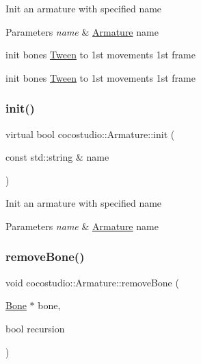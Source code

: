 Init an armature with specified name 
\begin{DoxyParams}{Parameters}
{\em name} & \hyperlink{classcocostudio_1_1Armature}{Armature} name \\
\hline
\end{DoxyParams}
init bone\textquotesingle{}s \hyperlink{classcocostudio_1_1Tween}{Tween} to 1st movement\textquotesingle{}s 1st frame

init bone\textquotesingle{}s \hyperlink{classcocostudio_1_1Tween}{Tween} to 1st movement\textquotesingle{}s 1st frame \mbox{\label{classcocostudio_1_1Armature_a22bc686ea92c2dad9559d848fb3554f1}} 
\subsubsection{\texorpdfstring{init()}{init()}\hspace{0.1cm}{\footnotesize\ttfamily [4/4]}}
{\footnotesize\ttfamily virtual bool cocostudio\+::\+Armature\+::init (\begin{DoxyParamCaption}\item[{const std\+::string \&}]{name }\end{DoxyParamCaption})\hspace{0.3cm}{\ttfamily [virtual]}}

Init an armature with specified name 
\begin{DoxyParams}{Parameters}
{\em name} & \hyperlink{classcocostudio_1_1Armature}{Armature} name \\
\hline
\end{DoxyParams}
\mbox{\label{classcocostudio_1_1Armature_a412c0baaf26ff1b635de8b426bb3ecae}} 
\subsubsection{\texorpdfstring{remove\+Bone()}{removeBone()}\hspace{0.1cm}{\footnotesize\ttfamily [1/2]}}
{\footnotesize\ttfamily void cocostudio\+::\+Armature\+::remove\+Bone (\begin{DoxyParamCaption}\item[{\hyperlink{classcocostudio_1_1Bone}{Bone} $\ast$}]{bone,  }\item[{bool}]{recursion }\end{DoxyParamCaption})\hspace{0.3cm}{\ttfamily [virtual]}}

